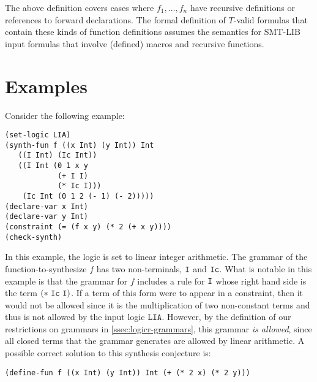 \documentclass[english,a4paper,10pt]{article}
\begin{document}
The above definition covers cases where $f_1, \ldots, f_n$
have recursive definitions or references to forward declarations.
The formal definition of $T$-valid formulas that contain these kinds of
function definitions assumes the semantics for SMT-LIB input formulas that 
involve (defined) macros and recursive functions.

\section{Examples}
\label{sec:examples}


\begin{example}
Consider the following example:
\begin{lstlisting}[basicstyle={\ttfamily}]
(set-logic LIA)
(synth-fun f ((x Int) (y Int)) Int
   ((I Int) (Ic Int))
   ((I Int (0 1 x y
            (+ I I)
            (* Ic I)))
    (Ic Int (0 1 2 (- 1) (- 2)))))
(declare-var x Int)
(declare-var y Int)
(constraint (= (f x y) (* 2 (+ x y))))
(check-synth)
\end{lstlisting}
In this example, the logic is set 
to linear integer arithmetic.
The grammar of the function-to-synthesize $f$
has two non-terminals, ${\tt I}$ and ${\tt Ic}$.
What is notable in this example is that
the grammar for $f$ includes a rule for ${\tt I}$ whose right hand side 
is the term ${\tt(*\ Ic\ I)}$. 
If a term of this form were to appear
in a constraint, 
then it would not be allowed since it is the
multiplication of two non-constant terms and thus is not allowed by the input logic ${\tt LIA}$.
However, 
by the definition of our restrictions on grammars in \cref{ssec:logicr-grammars},
this grammar \emph{is allowed},
since all closed terms that the grammar generates are allowed by linear arithmetic.
A possible correct solution to this synthesis conjecture is:
\begin{lstlisting}[basicstyle={\ttfamily}]
(define-fun f ((x Int) (y Int)) Int (+ (* 2 x) (* 2 y)))
\end{lstlisting}
\end{example}
\end{document}
